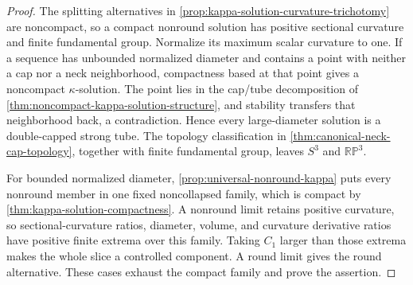 \begin{proof}
The splitting alternatives in
\ref{prop:kappa-solution-curvature-trichotomy} are noncompact, so a compact
nonround solution has positive sectional curvature and finite fundamental
group.  Normalize its maximum scalar curvature to one.  If a sequence has
unbounded normalized diameter and contains a point with neither a cap nor a
neck neighborhood, compactness based at that point gives a noncompact
$\kappa$-solution.  The point lies in the cap/tube decomposition of
\ref{thm:noncompact-kappa-solution-structure}, and stability transfers that
neighborhood back, a contradiction.  Hence every large-diameter solution is
a double-capped strong tube.  The topology classification in
\ref{thm:canonical-neck-cap-topology}, together with finite fundamental
group, leaves $S^3$ and $\mathbb{RP}^3$.

For bounded normalized diameter,
\ref{prop:universal-nonround-kappa} puts every nonround member in one fixed
noncollapsed family, which is compact by
\ref{thm:kappa-solution-compactness}.  A nonround limit retains positive
curvature, so sectional-curvature ratios, diameter, volume, and curvature
derivative ratios have positive finite extrema over this family.  Taking
$C_1$ larger than those extrema makes the whole slice a controlled
component.  A round limit gives the round alternative.  These cases exhaust
the compact family and prove the assertion.
\end{proof}

